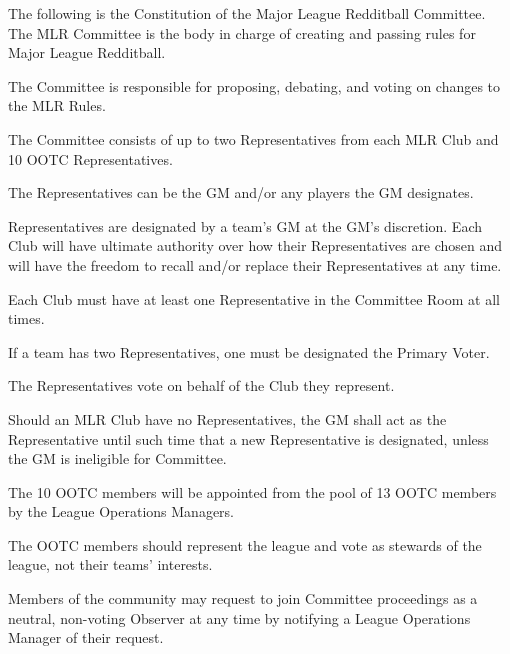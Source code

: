 

The following is the Constitution of the Major League Redditball Committee. The MLR Committee is the body in charge of creating and passing rules for Major League Redditball.

\begin{deepEnumerate}
    \item The Committee is responsible for proposing, debating, and voting on changes to the MLR Rules.
    \item The Committee consists of up to two Representatives from each MLR Club and 10 OOTC Representatives. 
    \item The Representatives can be the GM and/or any players the GM designates.
    \begin{deepEnumerate}
        \item Representatives are designated by a team's GM at the GM's discretion. Each Club will have ultimate authority over how their Representatives are chosen
        and will have the freedom to recall and/or replace their Representatives at any time.
        \item Each Club must have at least one Representative in the Committee Room at all times.
        \item If a team has two Representatives, one must be designated the Primary Voter.
        \item The Representatives vote on behalf of the Club they represent.
    \end{deepEnumerate}
    \item Should an MLR Club have no Representatives, the GM shall act as the Representative until such time that a new Representative is designated,
    unless the GM is ineligible for Committee.
    \item The 10 OOTC members will be appointed from the pool of 13 OOTC members by the League Operations Managers.
    \begin{deepEnumerate}
        \item The OOTC members should represent the league and vote as stewards of the league, not their teams' interests.
    \end{deepEnumerate}
    \item Members of the community may request to join Committee proceedings as a neutral, non-voting Observer at any time by notifying a League Operations Manager of their request.

\end{deepEnumerate}
